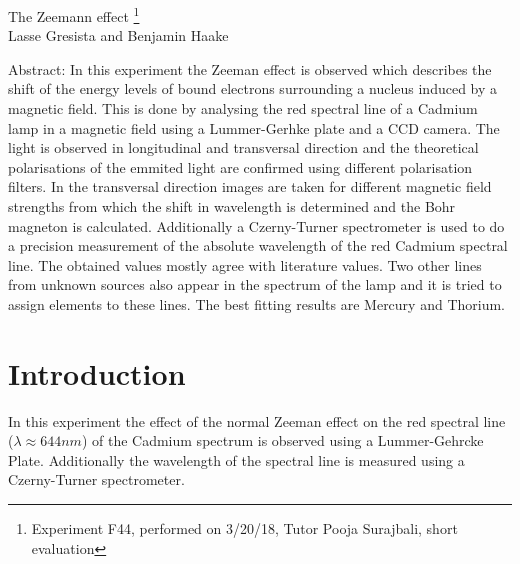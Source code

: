 \documentclass[12pt]{article}
\begin{document}
\thispagestyle{empty}     %
\null
\vspace{40mm}
\begin{center}
{%
\Large  The Zeemann effect
\footnote{\noindent Experiment F44, performed on 3/20/18, Tutor Pooja Surajbali, short evaluation}}\\[15mm]
Lasse Gresista and Benjamin Haake

\vspace{25mm}

\parbox{0.9\textwidth}{   %
Abstract:    
\small In this experiment the Zeeman effect is observed which describes the shift of the energy levels of bound electrons surrounding a nucleus induced by a magnetic field. This is done by analysing the red spectral line of a Cadmium lamp in a magnetic field using a Lummer-Gerhke plate and a CCD camera. The light is observed in longitudinal and transversal direction and the theoretical polarisations of the emmited light are confirmed using different polarisation filters. In the transversal direction images are taken for different magnetic field strengths from which the shift in wavelength is determined and the Bohr magneton is calculated. Additionally a Czerny-Turner spectrometer is used to do a precision measurement of the absolute wavelength of the red Cadmium spectral line. The obtained values mostly agree with literature values. Two other lines from unknown sources also appear in the spectrum of the lamp and it is tried to assign elements to these lines. The best fitting results are Mercury and Thorium. 
}
\end{center}

\vfill
\vspace{20mm}


\newpage
{}

\section{Introduction}
In this experiment the effect of the normal Zeeman effect on the red spectral line ($\lambda\approx644nm$) of the Cadmium spectrum is observed using a Lummer-Gehrcke Plate. Additionally the wavelength of the spectral line is measured using a Czerny-Turner spectrometer. 
\end{document}
